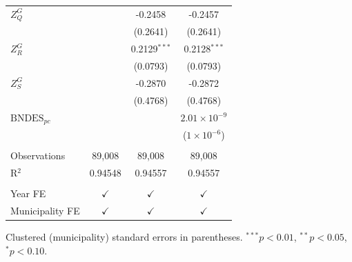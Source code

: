 \begin{tabular}{lccc}
   $Z^{G}_Q$            &                & -0.2458         & -0.2457\\   
                        &                & (0.2641)        & (0.2641)\\   
   $Z^{G}_R$            &                & 0.2129$^{***}$  & 0.2128$^{***}$\\   
                        &                & (0.0793)        & (0.0793)\\   
   $Z^{G}_S$            &                & -0.2870         & -0.2872\\   
                        &                & (0.4768)        & (0.4768)\\   
   $\text{BNDES}_{pc}$  &                &                 & $2.01\times 10^{-9}$\\    
                        &                &                 & ($1\times 10^{-6}$)\\    
    \\
   Observations         & 89,008         & 89,008          & 89,008\\  
   R$^2$                & 0.94548        & 0.94557         & 0.94557\\  
    \\
   Year FE              & $\checkmark$   & $\checkmark$    & $\checkmark$\\   
   Municipality FE      & $\checkmark$   & $\checkmark$    & $\checkmark$\\   
   \bottomrule
\end{tabular}
 
\par \raggedright 
Clustered (municipality) standard errors in parentheses. $^{***}p<0.01$, $^{**}p<0.05$, $^{*}p<0.10$.
\par\endgroup
